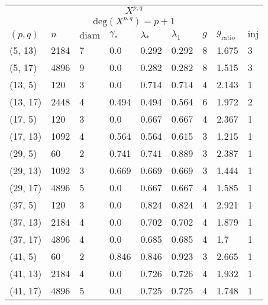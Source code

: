 \begin{center}
	\begin{tabular}{ p{1.5cm}|p{1cm}|p{1cm}|p{1cm}|p{1cm}|p{1cm}|p{1cm}|p{1cm}|p{1cm} }
		\multicolumn{9}{c}{$X^{p,q}$} \\
		\multicolumn{9}{c}{$\mathrm{deg}(X^{p,q}) = p + 1$} \\
		\hline
		$(p,q)$ & $n$ &  $\mathrm{diam}$ & $\gamma_*$ & $\lambda_{*}$ & $\lambda_1$ & $g$ & $g_{\mathrm{ratio}}$ & $\mathrm{inj}$     \\
		\hline
		(5, 13) & 2184 & 7 &  0.0 & 0.292 & 0.292 & 8 & 1.675 & 3 \\
		(5, 17) & 4896 & 9 &  0.0 & 0.282 & 0.282 & 8 & 1.515 & 3 \\
		(13, 5) & 120 & 3 &  0.0 & 0.714 & 0.714 & 4 & 2.143 & 1 \\
		(13, 17) & 2448 & 4 &  0.494 & 0.494 & 0.564 & 6 & 1.972 & 2 \\
		(17, 5) & 120 & 3 &  0.0 & 0.667 & 0.667 & 4 & 2.367 & 1 \\
		(17, 13) & 1092 & 4 &  0.564 & 0.564 & 0.615 & 3 & 1.215 & 1 \\
		(29, 5) & 60 & 2 &  0.741 & 0.741 & 0.889 & 3 & 2.387 & 1 \\
		(29, 13) & 1092 & 3 &  0.669 & 0.669 & 0.669 & 3 & 1.444 & 1 \\
		(29, 17) & 4896 & 5 &  0.0 & 0.667 & 0.667 & 4 & 1.585 & 1 \\
		(37, 5) & 120 & 3 &  0.0 & 0.824 & 0.824 & 4 & 2.921 & 1 \\
		(37, 13) & 2184 & 4 &  0.0 & 0.702 & 0.702 & 4 & 1.879 & 1 \\
		(37, 17) & 4896 & 4 &  0.0 & 0.685 & 0.685 & 4 & 1.7 & 1 \\
		(41, 5) & 60 & 2 &  0.846 & 0.846 & 0.923 & 3 & 2.665 & 1 \\
		(41, 13) & 2184 & 4 &  0.0 & 0.726 & 0.726 & 4 & 1.932 & 1 \\
		(41, 17) & 4896 & 5 &  0.0 & 0.725 & 0.725 & 4 & 1.748 & 1 
	\end{tabular}
\end{center}

